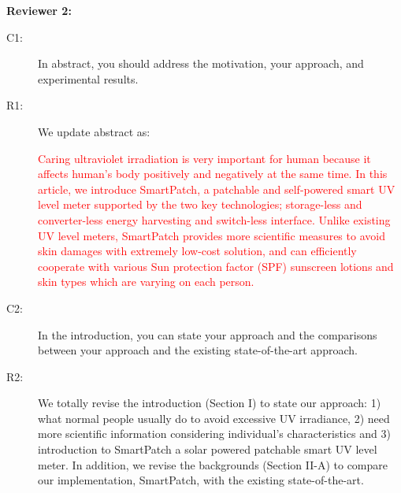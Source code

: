 \documentclass[onecolumn]{IEEEconf}
\begin{document}
\textbf{Reviewer 2:}
\begin{description}
\item [C1: ] In abstract, you should address the motivation, your approach, and experimental results.

\item [R1: ] We update abstract as:

\textcolor{red}{Caring ultraviolet irradiation is very important for human because it affects human's body positively and negatively at the same time. In this article, we introduce SmartPatch, a patchable and self-powered smart UV level meter supported by the two key technologies; storage-less and converter-less energy harvesting and switch-less interface. Unlike existing UV level meters, SmartPatch provides more scientific measures to avoid skin damages with extremely low-cost solution, and can efficiently cooperate with various Sun protection factor (SPF) sunscreen lotions and skin types which are varying on each person.}
~\\

\item [C2: ] In the introduction, you can state your approach and the comparisons between your approach and the existing state-of-the-art approach.
\item [R2: ] We totally revise the introduction (Section I) to state our approach: 1) what normal people usually do to avoid excessive UV irradiance, 2) need more scientific information considering individual's characteristics and 3) introduction to SmartPatch a solar powered patchable smart UV level meter. In addition, we revise the backgrounds (Section II-A) to compare our implementation, SmartPatch, with the existing state-of-the-art.\\


\end{description}
\end{document}
